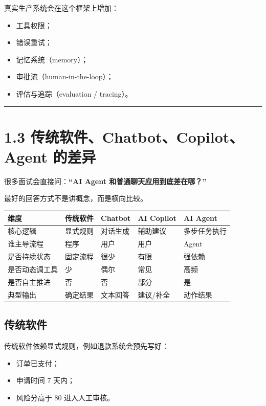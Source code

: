 真实生产系统会在这个框架上增加：


\begin{itemize}[leftmargin=2em]
\item 工具权限；
\item 错误重试；
\item 记忆系统（memory）；
\item 审批流（human-in-the-loop）；
\item 评估与追踪（evaluation / tracing）。
\end{itemize}

\bigskip\hrule\bigskip

\section{1.3 传统软件、Chatbot、Copilot、Agent 的差异}

很多面试会直接问：\textbf{``AI Agent 和普通聊天应用到底差在哪？''}

最好的回答方式不是讲概念，而是横向比较。


\begingroup
\scriptsize
\setlength{\tabcolsep}{3pt}
\begin{longtable}{|p{}|p{}|p{}|p{}|p{}|}
\hline
维度 & 传统软件 & Chatbot & AI Copilot & AI Agent \\ \hline
核心逻辑 & 显式规则 & 对话生成 & 辅助建议 & 多步任务执行 \\ \hline
谁主导流程 & 程序 & 用户 & 用户 & Agent \\ \hline
是否持续状态 & 固定流程 & 很少 & 有限 & 强依赖 \\ \hline
是否动态调工具 & 少 & 偶尔 & 常见 & 高频 \\ \hline
是否自主推进 & 否 & 否 & 部分 & 是 \\ \hline
典型输出 & 确定结果 & 文本回答 & 建议/补全 & 动作结果 \\ \hline
\end{longtable}
\endgroup

\subsection{传统软件}

传统软件依赖显式规则，例如退款系统会预先写好：


\begin{itemize}[leftmargin=2em]
\item 订单已支付；
\item 申请时间 7 天内；
\item 风险分高于 80 进入人工审核。
\end{itemize}

